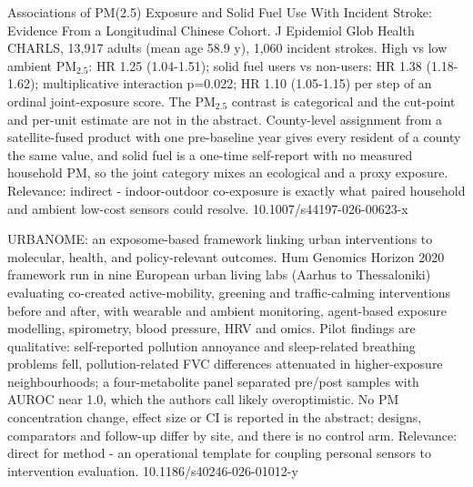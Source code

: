 \documentclass[10pt]{article}
\begin{document}
{Associations of PM(2.5) Exposure and Solid Fuel Use With Incident Stroke: Evidence From a Longitudinal Chinese Cohort.}
{J Epidemiol Glob Health}
{CHARLS, 13,917 adults (mean age 58.9 y), 1,060 incident strokes. High vs low ambient PM$_{2.5}$: HR 1.25 (1.04-1.51); solid fuel users vs non-users: HR 1.38 (1.18-1.62); multiplicative interaction p=0.022; HR 1.10 (1.05-1.15) per step of an ordinal joint-exposure score. The PM$_{2.5}$ contrast is categorical and the cut-point and per-unit estimate are not in the abstract. County-level assignment from a satellite-fused product with one pre-baseline year gives every resident of a county the same value, and solid fuel is a one-time self-report with no measured household PM, so the joint category mixes an ecological and a proxy exposure. Relevance: indirect - indoor-outdoor co-exposure is exactly what paired household and ambient low-cost sensors could resolve.}
{10.1007/s44197-026-00623-x}

\par{}\baselineskip{}\baselineskip
{}

{URBANOME: an exposome-based framework linking urban interventions to molecular, health, and policy-relevant outcomes.}
{Hum Genomics}
{Horizon 2020 framework run in nine European urban living labs (Aarhus to Thessaloniki) evaluating co-created active-mobility, greening and traffic-calming interventions before and after, with wearable and ambient monitoring, agent-based exposure modelling, spirometry, blood pressure, HRV and omics. Pilot findings are qualitative: self-reported pollution annoyance and sleep-related breathing problems fell, pollution-related FVC differences attenuated in higher-exposure neighbourhoods; a four-metabolite panel separated pre/post samples with AUROC near 1.0, which the authors call likely overoptimistic. No PM concentration change, effect size or CI is reported in the abstract; designs, comparators and follow-up differ by site, and there is no control arm. Relevance: direct for method - an operational template for coupling personal sensors to intervention evaluation.}
{10.1186/s40246-026-01012-y}
\end{document}

